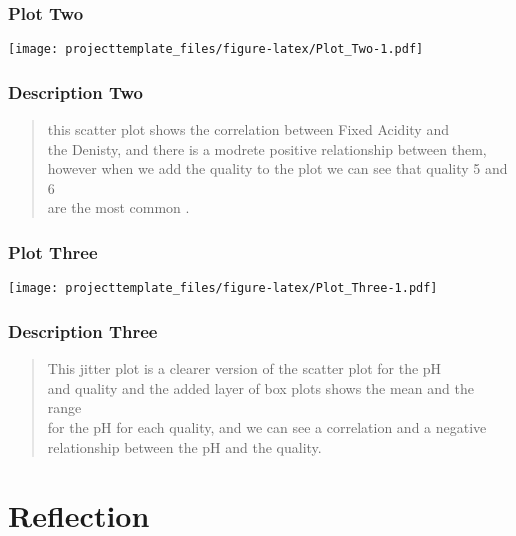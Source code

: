 \documentclass[]{article}
\begin{document}
\subsubsection{Plot Two}\label{plot-two}

\texttt{[image: projecttemplate\_files/figure-latex/Plot\_Two-1.pdf]}

\subsubsection{Description Two}\label{description-two}

\begin{quote}
this scatter plot shows the correlation between Fixed Acidity and\\
the Denisty, and there is a modrete positive relationship between
them,\\
however when we add the quality to the plot we can see that quality 5
and 6\\
are the most common .
\end{quote}

\subsubsection{Plot Three}\label{plot-three}

\texttt{[image: projecttemplate\_files/figure-latex/Plot\_Three-1.pdf]}

\subsubsection{Description Three}\label{description-three}

\begin{quote}
This jitter plot is a clearer version of the scatter plot for the pH\\
and quality and the added layer of box plots shows the mean and the
range\\
for the pH for each quality, and we can see a correlation and a
negative\\
relationship between the pH and the quality.
\end{quote}

\section{Reflection}\label{reflection}
\end{document}
